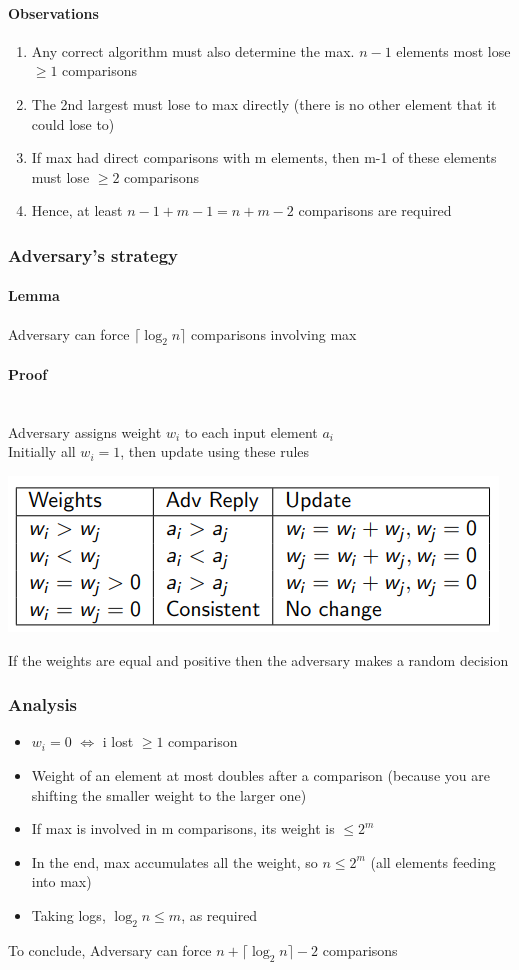 \documentclass{article}[18pt]
\begin{document}
\paragraph{Observations}
\begin{enumerate}
	\item Any correct algorithm must also determine the max. $n-1$ elements most lose $\geqslant 1$ comparisons
	\item The 2nd largest must lose to max directly (there is no other element that it could lose to)
	\item If max had direct comparisons with m elements, then m-1 of these elements must lose $\geqslant 2$ comparisons
	\item Hence, at least $n-1+m-1=n+m-2$ comparisons are required
\end{enumerate}
\subsubsection{Adversary's strategy}
\paragraph{Lemma}
Adversary can force $\lceil\log_2 n\rceil$ comparisons involving max
\paragraph{Proof}$ $\\
Adversary assigns weight $w_i$ to each input element $a_i$\\
Initially all $w_i=1$, then update using these rules
\begin{center}
\includegraphics[scale=0.7]{strategy}
\end{center}
If the weights are equal and positive then the adversary makes a random decision
\subsubsection{Analysis}
\begin{itemize}
\item $w_i=0$ $\Leftrightarrow$ i lost $\geqslant 1$ comparison
\item Weight of an element at most doubles after a comparison (because you are shifting the smaller weight to the larger one)
\item If max is involved in m comparisons, its weight is $\leqslant 2^m$
\item In the end, max accumulates all the weight, so $n\leqslant 2^m$ (all elements feeding into max)
\item Taking logs, $\log_2 n\leqslant m$, as required
\end{itemize}
To conclude, Adversary can force $n+\lceil \log_2 n \rceil -2$ comparisons
\end{document}
